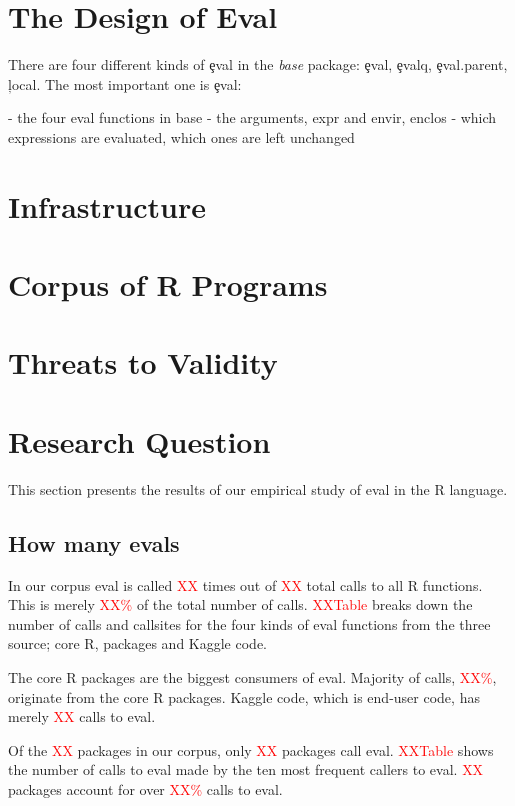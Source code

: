 \documentclass[conference]{IEEEtran}
\newcommand{\missingNumber}{\textcolor{red}{XX}\xspace}
\newcommand{\missingPercentage}{\textcolor{red}{XX\%}\xspace}
\newcommand{\missingTable}{\textcolor{red}{XXTable}\xspace}
\begin{document}
\section{The Design of Eval}

There are four different kinds of \c{eval} in the \emph{base} package:  \c{eval}, \c{evalq}, \c{eval.parent},  \c{local}.
The most important one is \c{eval}:



- the four eval functions in base
- the arguments, expr and envir, enclos
- which expressions are evaluated, which ones are left unchanged

\section{Infrastructure}


\section{Corpus of R Programs}


\section{Threats to Validity}


\section{Research Question}
This section presents the results of our empirical study of eval in the R language.
\subsection{How many evals}

In our corpus eval is called \missingNumber times out of \missingNumber
total calls to all R functions. This is merely \missingPercentage of the total
number of calls. \missingTable breaks down the number of calls and callsites for
the four kinds of eval functions from the three source; core R, packages and
Kaggle code.

The core R packages are the biggest consumers of eval. Majority of calls,
\missingPercentage, originate from the core R packages. Kaggle code, which is
end-user code, has merely \missingNumber calls to eval.

Of the \missingNumber packages in our corpus, only \missingNumber packages call
eval. \missingTable shows the number of calls to eval made by the ten most
frequent callers to eval. \missingNumber packages account for over
\missingPercentage calls to eval.
\end{document}
